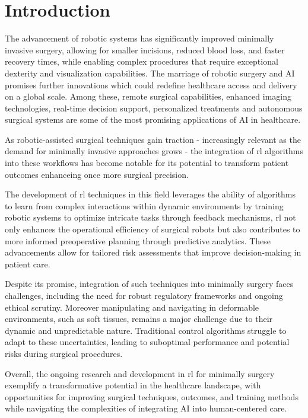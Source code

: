 \chapter{Introduction}

The advancement of robotic systems has significantly improved minimally 
invasive surgery, allowing for smaller incisions, reduced blood loss, and faster recovery times, 
while enabling complex procedures that require exceptional dexterity and visualization capabilities.
The marriage of robotic surgery and AI promises further innovations which could redefine 
healthcare access and delivery on a global scale.
Among these, remote surgical capabilities, enhanced imaging technologies, real-time decision 
support, personalized treatments and autonomous surgical systems are some of the most promising applications
of AI in healthcare. 

As robotic-assisted surgical techniques gain traction - increasingly relevant as the demand for minimally 
invasive approaches grows -
the integration of \gls{rl} algorithms into these workflows has become notable for its potential to 
transform patient outcomes enhanceing once more surgical precision. 

The development of \gls{rl} techniques in this field leverages the ability of algorithms to learn 
from complex interactions within dynamic environments by training robotic systems to 
optimize intricate tasks through feedback mechanisms, \gls{rl} not only enhances the operational efficiency 
of surgical robots but also contributes to more informed preoperative planning through predictive 
analytics. 
These advancements allow for tailored risk assessments that improve decision-making in patient care.


Despite its promise, integration of such techniques into minimally surgery faces
challenges, including the need for robust regulatory frameworks and ongoing ethical scrutiny.
Moreover manipulating and navigating in deformable environments, such as soft tissues, 
remains a major challenge due to their dynamic and unpredictable nature. 
Traditional control algorithms struggle to adapt to these uncertainties, leading to 
suboptimal performance and potential risks during surgical procedures. 

Overall, the ongoing research and development in \gls{rl} for minimally 
surgery exemplify a transformative potential in the healthcare landscape, with opportunities for 
improving surgical techniques, outcomes, and training methods while navigating the complexities 
of integrating AI into human-centered care.

